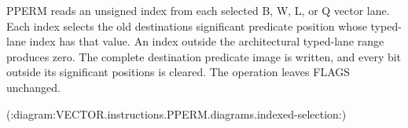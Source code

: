 PPERM reads an unsigned index from each selected B, W, L, or Q vector lane.
Each index selects the old destination\textquotesingle{}s significant predicate position whose
typed-lane index has that value.
An index outside the architectural typed-lane range produces zero.
The complete destination predicate image is written, and every bit outside its significant positions is cleared.
The operation leaves FLAGS unchanged.

(:diagram:VECTOR.instructions.PPERM.diagrams.indexed-selection:)
